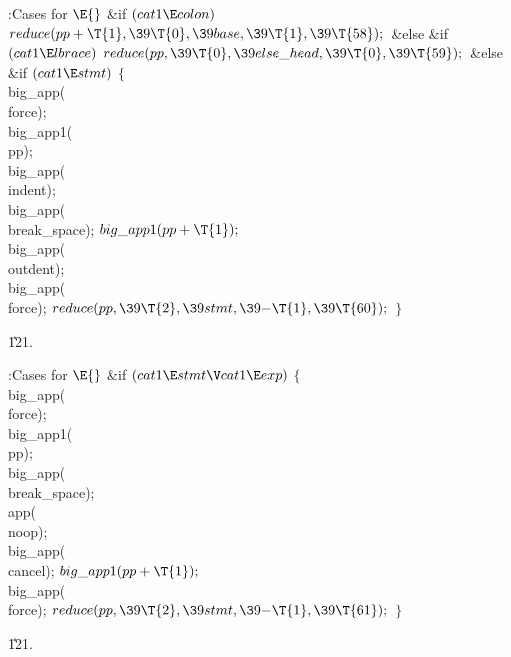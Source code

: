 \B{}:Cases for \X${}\E{}$\6
\&{if} ${}(\\{cat1}\E\\{colon}){}$\1\5
${}\\{reduce}(\\{pp}+\T{1},\39\T{0},\39\\{base},\39\T{1},\39\T{58});{}$\2\6
\&{else} \&{if} ${}(\\{cat1}\E\\{lbrace}){}$\1\5
${}\\{reduce}(\\{pp},\39\T{0},\39\\{else\_head},\39\T{0},\39\T{59});{}$\2\6
\&{else} \&{if} ${}(\\{cat1}\E\\{stmt}){}$\5
${}\{{}$\1\6
\\{big\_app}(\\{force});\6
\\{big\_app1}(\\{pp});\6
\\{big\_app}(\\{indent});\6
\\{big\_app}(\\{break\_space});\6
${}\\{big\_app1}(\\{pp}+\T{1});{}$\6
\\{big\_app}(\\{outdent});\6
\\{big\_app}(\\{force});\6
${}\\{reduce}(\\{pp},\39\T{2},\39\\{stmt},\39{-}\T{1},\39\T{60});{}$\6
\4${}\}{}$\2\par
\U121.\fi

\B{}:Cases for \X${}\E{}$\6
\&{if} ${}(\\{cat1}\E\\{stmt}\V\\{cat1}\E\\{exp}){}$\5
${}\{{}$\1\6
\\{big\_app}(\\{force});\6
\\{big\_app1}(\\{pp});\6
\\{big\_app}(\\{break\_space});\6
\\{app}(\\{noop});\6
\\{big\_app}(\\{cancel});\6
${}\\{big\_app1}(\\{pp}+\T{1});{}$\6
\\{big\_app}(\\{force});\6
${}\\{reduce}(\\{pp},\39\T{2},\39\\{stmt},\39{-}\T{1},\39\T{61});{}$\6
\4${}\}{}$\2\par
\U121.\fi

